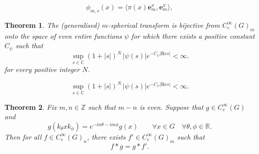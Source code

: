 \documentclass[10pt,a4paper]{amsart}
\newtheorem{thm}{Theorem}
\newcommand{\R}{\mathbb{R}}
\newcommand{\Z}{\mathbb{Z}}
\newcommand{\eb}{\mathbf{e}}
\newcommand{\var}{s}
\begin{document}
\begin{equation}\label{e:sfer-repr}
\phi_{m,\var}(x)=\langle \pi(x)\eb^{\pi}_m,\eb^{\pi}_m\rangle ,
\end{equation}

\begin{thm}\label{thm:PW}
The (generalised) $m$-spherical transform is bijective  from  $C^\infty_c(G)_m$ onto the space of even entire functions $\psi$ for which there exists a positive constant $C_\psi$ such that
\begin{equation}\label{e:uet}
\sup_{\var\in \mathbb C} (1+|\var|)^{N}\, |\psi(\var)| e^{-C_\psi |\mathrm{Re} \var|}<\infty.
\end{equation}
 for every positive integer $N$.
\end{thm}

\begin{equation}
\sup_{\var\in \mathbb C} (1+|\var|)^{N}\, |\psi(\var)| e^{-C_\psi |\mathrm{Re} \var|}<\infty.
\end{equation}

\begin{thm}\label{thm:f-star-g}
Fix $m,n \in \Z$ such that $m-n$ is even.
Suppose that $g \in C^\infty_c(G)$ and 
\begin{equation}\label{eq:invariance-mn}
g(k_\theta x k_\phi) = e^{-i n\theta-im\phi}  g(x) 
\qquad\forall x \in G  \quad\forall \theta, \phi \in \R.
\end{equation}
Then for all $f \in C^\infty_c(G)_n$, there exists $f' \in C^\infty_c(G)_m$ such that 
\[
f * g = g * f'  .
\]
\end{thm}
\end{document}

